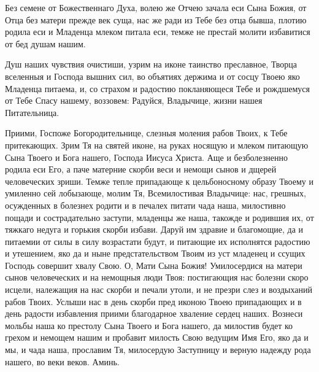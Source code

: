 \begin{mymulticols}



Без семене от Божественнаго Духа, волею же Отчею зачала еси Сына Божия, от Отца без матери прежде век суща, нас же ради из Тебе без отца бывша, плотию родила еси и Младенца млеком питала еси, темже не престай молити избавитися от бед душам нашим.


Душ наших чувствия очистиши, узрим на иконе таинство преславное, Творца вселенныя и Господа вышних сил, во объятиях держима и от сосцу Твоею яко Младенца питаема, и, со страхом и радостию покланяющеся Тебе и рождшемуся от Тебе Спасу нашему, воззовем: Радуйся, Владычице, жизни нашея Питательница.


Приими, Госпоже Богородительнице, слезныя моления рабов Твоих, к Тебе притекающих. Зрим Тя на святей иконе, на руках носящую и млеком питающую Сына Твоего и Бога нашего, Господа Иисуса Христа. Аще и безболезненно родила еси Его, а паче матерние скорби веси и немощи сынов и дщерей человеческих зриши. Темже тепле припадающе к цельбоносному образу Твоему и умиленно сей лобызающе, молим Тя, Всемилостивая Владычице: нас, грешных, осужденных в болезнех родити и в печалех питати чада наша, милостивно пощади и сострадательно заступи, младенцы же наша, такожде и родившия их, от тяжкаго недуга и горькия скорби избави. Даруй им здравие и благомощие, да и питаемии от силы в силу возрастати будут, и питающие их исполнятся радостию и утешением, яко да и ныне предстательством Твоим из уст младенец и ссущих Господь совершит хвалу Свою. О, Мати Сына Божия! Умилосердися на матери сынов человеческих и на немощныя люди Твоя: постигающия нас болезни скоро исцели, належащия на нас скорби и печали утоли, и не презри слез и воздыханий рабов Твоих. Услыши нас в день скорби пред иконою Твоею припадающих и в день радости избавления приими благодарное хваление сердец наших. Вознеси мольбы наша ко престолу Сына Твоего и Бога нашего, да милостив будет ко грехом и немощем нашим и пробавит милость Свою ведущим Имя Его, яко да и мы, и чада наша, прославим Тя, милосердую Заступницу и верную надежду рода нашего, во веки веков. Аминь.

\end{mymulticols}

